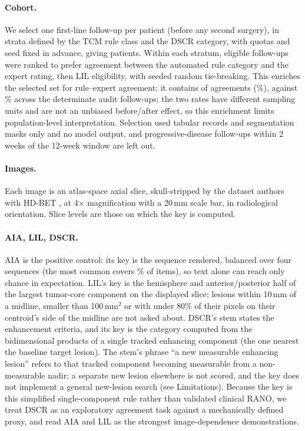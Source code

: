 \documentclass[conference]{IEEEtran}
\begin{document}
\paragraph{Cohort.} We select one first-line follow-up per patient (before any second surgery), in strata defined by the TCM rule class and the DSCR category, with quotas and seed fixed in advance, giving \vfourPatients{} patients. Within each stratum, eligible follow-ups were ranked to prefer agreement between the automated rule category and the expert rating, then LIL eligibility, with seeded random tie-breaking. This enriches the selected set for rule--expert agreement: it contains \vfourSelectedAgree{} of \vfourPatients{} agreements (\vfourSelectedAgreePct{}\%), against \vfourConcordantDetPct{}\% across the \vfourDeterminate{} determinate audit follow-ups; the two rates have different sampling units and are not an unbiased before/after effect, so this enrichment limits population-level interpretation. Selection used tabular records and segmentation masks only and no model output, and progressive-disease follow-ups within 2 weeks of the 12-week window are left out.

\paragraph{Images.} Each image is an atlas-space axial slice, skull-stripped by the dataset authors with HD-BET \citep{isensee2019automated}, at 4$\times$ magnification with a 20\,mm scale bar, in radiological orientation. Slice levels are those on which the key is computed.

\paragraph{AIA, LIL, DSCR.} AIA is the positive control: its key is the sequence rendered, balanced over four sequences (the most common covers \vfourMajorityAIA{}\% of items), so text alone can reach only chance in expectation. LIL's key is the hemisphere and anterior/posterior half of the largest tumor-core component on the displayed slice; lesions within 10\,mm of a midline, smaller than 100\,mm$^2$ or with under 80\% of their pixels on their centroid's side of the midline are not asked about. DSCR's stem states the enhancement criteria, and its key is the category computed from the bidimensional products of a single tracked enhancing component (the one nearest the baseline target lesion). The stem's phrase ``a new measurable enhancing lesion'' refers to that tracked component becoming measurable from a non-measurable nadir; a separate new lesion elsewhere is not scored, and the key does not implement a general new-lesion search (see Limitations). Because the key is this simplified single-component rule rather than validated clinical RANO, we treat DSCR as an exploratory agreement task against a mechanically defined proxy, and read AIA and LIL as the strongest image-dependence demonstrations.
\end{document}
